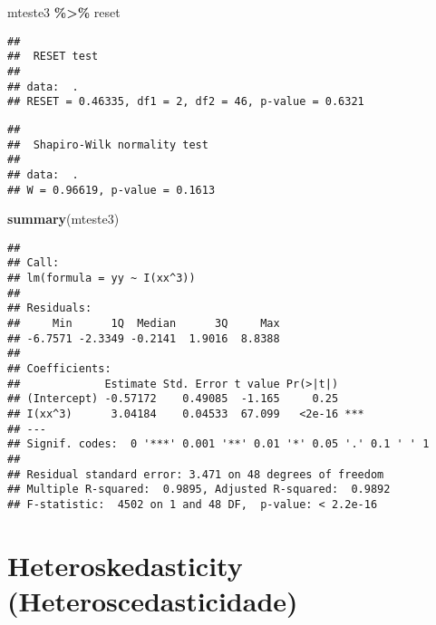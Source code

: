 \documentclass[
]{book}
\newenvironment{Shaded}{\begin{snugshade}}{\end{snugshade}}
\newcommand{\FunctionTok}[1]{\textcolor[rgb]{0.13,0.29,0.53}{\textbf{#1}}}
\newcommand{\NormalTok}[1]{#1}
\newcommand{\SpecialCharTok}[1]{\textcolor[rgb]{0.81,0.36,0.00}{\textbf{#1}}}
\begin{document}
\begin{Shaded}
\begin{Highlighting}[]
\NormalTok{mteste3 }\SpecialCharTok{\%\textgreater{}\%}
\NormalTok{    reset}
\end{Highlighting}
\end{Shaded}

\begin{verbatim}
## 
##  RESET test
## 
## data:  .
## RESET = 0.46335, df1 = 2, df2 = 46, p-value = 0.6321
\end{verbatim}

\begin{Shaded}
\end{Shaded}

\begin{verbatim}
## 
##  Shapiro-Wilk normality test
## 
## data:  .
## W = 0.96619, p-value = 0.1613
\end{verbatim}

\begin{Shaded}
\begin{Highlighting}[]
\FunctionTok{summary}\NormalTok{(mteste3)}
\end{Highlighting}
\end{Shaded}

\begin{verbatim}
## 
## Call:
## lm(formula = yy ~ I(xx^3))
## 
## Residuals:
##     Min      1Q  Median      3Q     Max 
## -6.7571 -2.3349 -0.2141  1.9016  8.8388 
## 
## Coefficients:
##             Estimate Std. Error t value Pr(>|t|)    
## (Intercept) -0.57172    0.49085  -1.165     0.25    
## I(xx^3)      3.04184    0.04533  67.099   <2e-16 ***
## ---
## Signif. codes:  0 '***' 0.001 '**' 0.01 '*' 0.05 '.' 0.1 ' ' 1
## 
## Residual standard error: 3.471 on 48 degrees of freedom
## Multiple R-squared:  0.9895, Adjusted R-squared:  0.9892 
## F-statistic:  4502 on 1 and 48 DF,  p-value: < 2.2e-16
\end{verbatim}

\hypertarget{heteroskedasticity-heteroscedasticidade}{%
\section{Heteroskedasticity
(Heteroscedasticidade)}\label{heteroskedasticity-heteroscedasticidade}}
\end{document}
